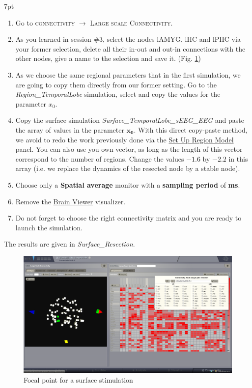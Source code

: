 \documentclass{tufte-handout}
\newenvironment{simulation}{%
  \def\FrameCommand{%
    \hspace{1pt}%
    {\color{ForestGreen}\vrule width 2pt}%
    {\color{simulationshade}\vrule width 4pt}%
    \colorbox{simulationshade}%
  }%
  \MakeFramed{\advance\hsize-\width\FrameRestore}%
  \noindent\hspace{-4.55pt}%
  \begin{adjustwidth}{}{7pt}%
  \vspace{2pt}\vspace{2pt}%
}
{%
  \vspace{2pt}\end{adjustwidth}\endMakeFramed%
}
\begin{document}
\begin{simulation}
  \begin{enumerate}
  \item Go to \textsc{connectivity} $\rightarrow$ \textsc{Large scale Connectivity}.
  \item As you learned in session \#3, select the nodes lAMYG, lHC and lPHC via your former selection, delete all their in-out and out-in connections
  with the other nodes, give a name to the selection and save it. (Fig. \ref{fig:resec})
  \item As we choose the same regional parameters that in the first simulation, we are going to copy them directly from our
  former setting. Go to the \textit{Region\_TemporalLobe} simulation, select and copy the values for the parameter  $x_0$. 
  \item Copy the surface simulation \textit{Surface\_TemporalLobe\_sEEG\_EEG} and paste the array of values in the parameter $\mathbf{x_0}$.
  With this direct copy-paste method, we avoid to redo the work previously done via the \underline{Set Up Region Model} panel.
  You can also use you own vector, as long as the length of this vector correspond to the number of regions.
  Change the values $\mathbf{-1.6}$ by $\mathbf{-2.2}$ in this array (i.e. we replace the dynamics of the resected node by a stable node).
  \item Choose only a \textbf{Spatial average} monitor with a \textbf{sampling period} of \textbf{\unit[1]{ms}}.
  \item Remove the \underline{Brain Viewer} visualizer.
  \item Do not forget to choose the right connectivity matrix and you are ready to launch the simulation.
  \end{enumerate}
\end{simulation}

The results are given in \textit{Surface\_Resection}.

\begin{figure}[h]
  \includegraphics[width=\linewidth]{Handout_UI_ModellingAnEpilepticPatient_ConnectivityMatrixResection}%
  \caption{Focal point for a surface stimulation}%
  \label{fig:resec}%
\end{figure}
\end{document}
